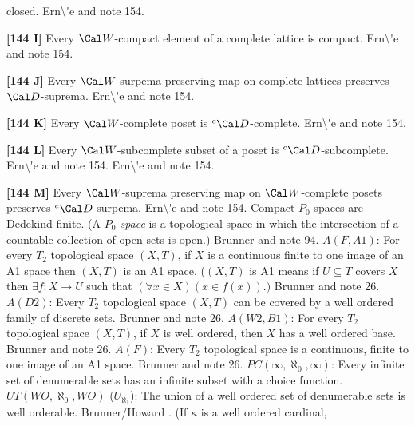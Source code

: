 closed.  \ac{Ern\'e} \cite{2000} and note 154. 
\smallskip
\item{}{\bf [144 I]}  Every $\Cal W$-compact element of a complete
lattice is compact.  \ac{Ern\'e} \cite{2000} and note 154.
\smallskip
\item{}{\bf [144 J]} Every $\Cal W$-surpema preserving map on
complete lattices preserves $\Cal D$-suprema.
\ac{Ern\'e} \cite{2000} and note 154.
\smallskip
\item{}{\bf [144 K]} Every $\Cal W$-complete poset is $^c\Cal
D$-complete.  \ac{Ern\'e} \cite{2000} and note 154.
\smallskip
\item{}{\bf [144 L]}  Every $\Cal W$-subcomplete subset of a poset
is $^c\Cal D$-subcomplete.  \ac{Ern\'e} \cite{2000} and note 154.
\ac{Ern\'e} \cite{2000} and note 154.  
\smallskip
\item{}{\bf [144 M]}  Every $\Cal W$-suprema preserving map on
$\Cal W$-complete posets preserves $^c\Cal D$-surpema.
\ac{Ern\'e} \cite{2000} and note 154.
\medskip
{}  Compact $P_0$-spaces are Dedekind finite. (A
{\it $P_0$-space} is a topological space in which the intersection of a
countable collection of open sets is open.) \ac{Brunner} \cite{1984c} and
note 94.
\medskip
{}  $A(F,A1)$: For every $T_2$ topological space
$(X,T)$, if $X$ is a continuous finite to one image of an A1 space then
$(X,T)$ is  an A1 space. ($(X,T)$ is A1 means if $U \subseteq  T$ covers
$X$ then $\exists f : X\rightarrow U$ such that $(\forall x\in X)
(x\in f(x)).)$  \ac{Brunner} \cite{1983d} and note 26.
\medskip
{}  $A(D2)$:  Every $T_2$ topological space $(X,T)$
can be covered by a well ordered family of discrete sets. \ac{Brunner}
\cite{1983d} and note 26.
\medskip
{} $A(W2,B1)$: For every $T_2$ topological space
$(X,T)$, if $X$ is well ordered, then $X$ has a well ordered base.
\ac{Brunner} \cite{1983d} and note 26.
\medskip
{}  $A(F)$:  Every $T_2$ topological space is a
continuous, finite to one image of an A1 space. \ac{Brunner} \cite{1983d}
and note 26.
\medskip
{} $PC(\infty,\aleph_0,\infty)$: Every infinite
set of denumerable sets has an infinite subset with a choice function.
\medskip
{} $UT(WO,\aleph_{0},WO)$ ($U_{\aleph_{1}}$):
The union of a well ordered set of denumerable sets is well  orderable.
\ac{Brunner/Howard} \cite{1992}. (If $\kappa$ is a well ordered cardinal,
